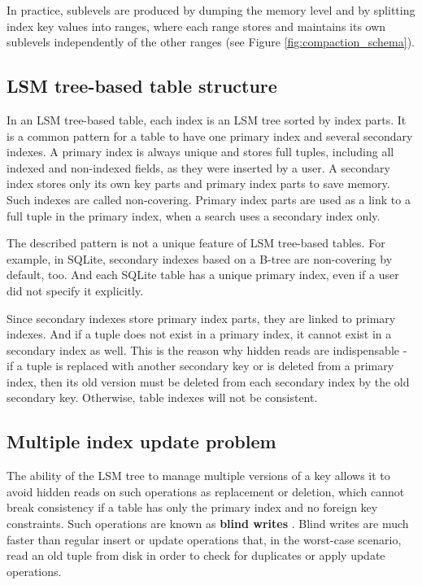 \documentclass{vldb}
\begin{document}
In practice, sublevels are produced by dumping the memory level and by splitting index
key values into ranges, where each range stores and maintains its own sublevels
independently of the other ranges (see Figure \ref{fig:compaction_schema}).

\subsection{LSM tree-based table structure}
In an LSM tree-based table, each index is an LSM tree sorted by index parts.
It is a common pattern for a table to have one primary index and several
secondary indexes. A primary index is always unique and stores full tuples,
including all indexed and non-indexed fields, as they were inserted by a user.
A secondary index stores only its own key parts and primary index parts to save
memory. Such indexes are called non-covering. Primary index parts are used as a link to
a full tuple in the primary index, when a search uses a secondary index only.

The described pattern is not a unique feature of LSM tree-based tables. For
example, in SQLite, secondary indexes based on a B-tree are non-covering by default,
too. And each SQLite table has a unique primary index, even if a user did not
specify it explicitly.

Since secondary indexes store primary index parts, they are linked to primary
indexes. And if a tuple does not exist in a primary index, it cannot exist in a
secondary index as well. This is the reason why hidden reads are
indispensable - if a tuple is replaced with another secondary key or is deleted
from a primary index, then its old version must be deleted from each secondary
index by the old secondary key. Otherwise, table indexes will not be consistent.

\subsection{Multiple index update problem}
The ability of the LSM tree to manage multiple versions of a key allows it to avoid hidden
reads on such operations as replacement or deletion, which cannot break consistency if
a table has only the primary index and no foreign key constraints. Such operations are known
as \textbf{blind writes} \cite{kai:slimdb}. Blind writes are much faster than regular insert
or update operations that, in the worst-case scenario, read an old tuple from disk in order
to check for duplicates or apply update operations.
\end{document}
